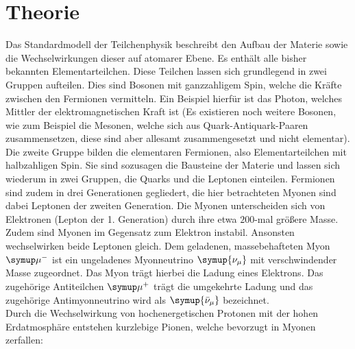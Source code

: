 \section{Theorie}
\label{sec:Theorie}
Das Standardmodell der Teilchenphysik beschreibt den Aufbau der Materie sowie die Wechselwirkungen dieser auf atomarer Ebene.
Es enthält alle bisher bekannten Elementarteilchen. Diese Teilchen lassen sich grundlegend in zwei Gruppen aufteilen.
Dies sind Bosonen mit ganzzahligem Spin, welche die Kräfte zwischen den Fermionen vermitteln. Ein Beispiel hierfür ist das Photon, welches Mittler der elektromagnetischen Kraft ist (Es existieren noch weitere Bosonen, wie zum Beispiel die Mesonen, welche sich aus Quark-Antiquark-Paaren zusammensetzen, diese sind aber allesamt zusammengesetzt und nicht elementar).
Die zweite Gruppe bilden die elementaren Fermionen, also Elementarteilchen mit halbzahligen Spin. Sie sind sozusagen die Bausteine der Materie und lassen sich wiederum in zwei Gruppen, die Quarks und die Leptonen einteilen.
Fermionen sind zudem in drei Generationen gegliedert, die hier betrachteten Myonen sind dabei Leptonen der zweiten Generation.
Die Myonen unterscheiden sich von Elektronen (Lepton der 1. Generation) durch ihre etwa $200$-mal größere Masse. Zudem sind Myonen im Gegensatz zum Elektron instabil. Ansonsten wechselwirken beide Leptonen gleich.
Dem geladenen, massebehafteten Myon $\symup\mu^-$ ist ein ungeladenes Myonneutrino $\symup{\nu_{\mu}}$ mit verschwindender Masse zugeordnet. Das Myon trägt hierbei die Ladung eines Elektrons. Das zugehörige Antiteilchen $\symup\mu^+$ trägt die umgekehrte Ladung und das zugehörige Antimyonneutrino wird als $\symup{\bar{\nu}_{\mu}}$ bezeichnet.
\\
Durch die Wechselwirkung von hochenergetischen Protonen mit der hohen Erdatmosphäre entstehen kurzlebige Pionen, welche bevorzugt in Myonen zerfallen:

